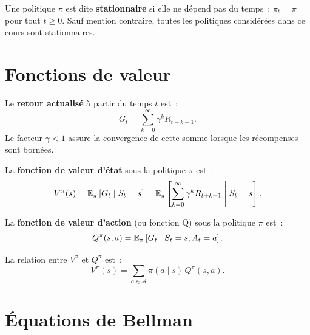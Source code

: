 \begin{definition}
Une politique $\pi$ est dite \textbf{stationnaire} si elle ne d\'epend pas du temps~:
$\pi_t = \pi$ pour tout $t \geq 0$. Sauf mention contraire, toutes les politiques
consid\'er\'ees dans ce cours sont stationnaires.
\end{definition}

\section{Fonctions de valeur}

\begin{definition}
Le \textbf{retour actualis\'e} \`a partir du temps $t$ est~:
\[
    G_t = \sum_{k=0}^{\infty} \gamma^k R_{t+k+1}.
\]
Le facteur $\gamma < 1$ assure la convergence de cette somme lorsque les r\'ecompenses
sont born\'ees.
\end{definition}

\begin{definition}
La \textbf{fonction de valeur d'\'etat} sous la politique $\pi$ est~:
\[
    V^\pi(s) = \mathbb{E}_\pi \left[ G_t \mid S_t = s \right]
    = \mathbb{E}_\pi \left[ \sum_{k=0}^{\infty} \gamma^k R_{t+k+1} \;\middle|\; S_t = s \right].
\]
\end{definition}

\begin{definition}
La \textbf{fonction de valeur d'action} (ou fonction Q) sous la politique $\pi$ est~:
\[
    Q^\pi(s, a) = \mathbb{E}_\pi \left[ G_t \mid S_t = s, A_t = a \right].
\]
\end{definition}

\begin{remarque}
La relation entre $V^\pi$ et $Q^\pi$ est~:
\[
    V^\pi(s) = \sum_{a \in \mathcal{A}} \pi(a \mid s) \, Q^\pi(s, a).
\]
\end{remarque}

\section{\'Equations de Bellman}

